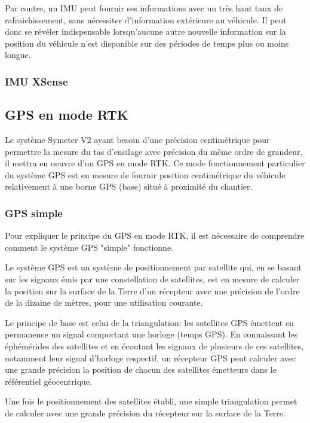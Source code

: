 \documentclass[12pt,a4paper]{report}
\begin{document}
		\para Par contre, un IMU peut fournir ses informations avec un très haut taux de rafraichissement, sans nécessiter d'information extérieure au véhicule. Il peut donc se révéler indispensable lorsqu'aucune autre nouvelle information sur la position du véhicule n'est disponible sur des périodes de temps plus ou moins longue.
		
		\subsubsection{IMU XSense}
		
		\subsection{GPS en mode RTK}
		
		Le système Symeter V2 ayant besoin d'une précision centimétrique pour permettre la mesure du tas d'ensilage avec précision du même ordre de grandeur, il mettra en oeuvre d'un GPS en mode RTK. Ce mode fonctionnement particulier du système GPS est en mesure de fournir position centimétrique du véhicule relativement à une borne GPS (base) situé à proximité du chantier.
		
		\subsubsection{GPS simple}
		Pour expliquer le principe du GPS en mode RTK, il est nécessaire de comprendre comment le système GPS "simple" fonctionne. 
		
		\para Le système GPS est un système de positionnement par satellite qui, en se basant sur les signaux émis par une constellation de satellites, est en mesure de calculer la position sur la surface de la Terre d'un récepteur avec une précision de l'ordre de la dizaine de mètres, pour une utilisation courante.
		
		\para Le principe de base est celui de la triangulation: les satellites GPS émettent en permanence un signal comportant une horloge (temps GPS). En connaissant les éphémérides des satellites et en écoutant les signaux de plusieurs de ces satellites, notamment leur signal d'horloge respectif, un récepteur GPS peut calculer avec une grande précision la position de chacun des satellites émetteurs dans le référentiel géocentrique.
		
		\para Une fois le positionnement des satellites établi, une simple triangulation permet de calculer avec une grande précision du récepteur sur la surface de la Terre.
		
\end{document}

